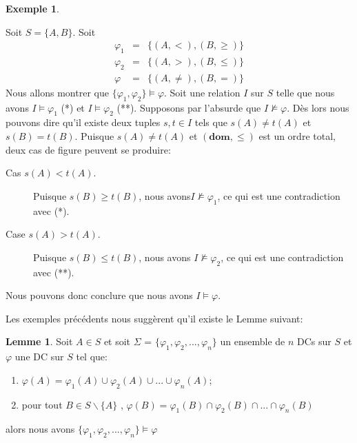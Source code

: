 \documentclass[letterpaper, 12pt]{report}
\theoremstyle{definition}
\newtheorem{mylemma}{Lemme}
\newtheorem{myexample}{Exemple}
\newcommand{\dom}{\mathbf{dom}}
\begin{document}
\begin{myexample}
\label{secondEx}

Soit $S=\{A,B\}$.
Soit
\begin{eqnarray*}
\varphi_{1} & = & \{(A,<), (B,\geq)\}\\
\varphi_{2} & = & \{(A,>), (B,\leq)\}\\
\varphi & = & \{(A,\neq), (B,=)\}
\end{eqnarray*}
Nous allons montrer que $\{\varphi_{1},\varphi_{2}\}\models\varphi$.
Soit une relation $I$ sur $S$ telle que nous avons $I\models\varphi_{1}$ (*) et $I\models\varphi_{2}$ (**).
Supposons par l'absurde que $I\not\models\varphi$.
Dès lors nous pouvons dire qu'il existe deux tuples $s,t\in I$ tels que
$s(A)\neq t(A)$ et $s(B)=t(B)$.
Puisque $s(A)\neq t(A)$ et $(\dom,\leq)$ est un ordre total,
deux cas de figure peuvent se produire:
\begin{description}
\item[Cas $s(A)<t(A)$.]
Puisque $s(B)\geq t(B)$, nous avons$I\not\models\varphi_{1}$, ce qui est une contradiction avec (*).
\item[Case $s(A)>t(A)$.]
Puisque $s(B)\leq t(B)$, nous avons $I\not\models\varphi_{2}$, ce qui est une contradiction avec (**).
\end{description}
Nous pouvons donc conclure que nous avons $I\models\varphi$.
\end{myexample}

Les exemples précédents nous suggèrent qu'il existe le Lemme suivant:\\

\begin{mylemma}
\label{simpliLemme}
Soit $A \in S$ et soit $\Sigma$ = $\{\varphi_1 , \varphi_2,..., \varphi_n \}$ un ensemble de $n$ DCs sur $S$ et $\varphi$ une DC sur $S$ tel que:
\begin{enumerate}
\item $\varphi(A) = \varphi_1(A) \cup \varphi_2(A) \cup ... \cup \varphi_n(A)$;
\item pour tout $B \in S \backslash \{ A \}$ , $\varphi(B) = \varphi_1(B) \cap \varphi_2(B) \cap  ... \cap \varphi_n(B)$
\end{enumerate}

alors nous avons $\{ \varphi_1 , \varphi_2 ,...,\varphi_n \} \models \varphi$
\end{mylemma}
\end{document}
